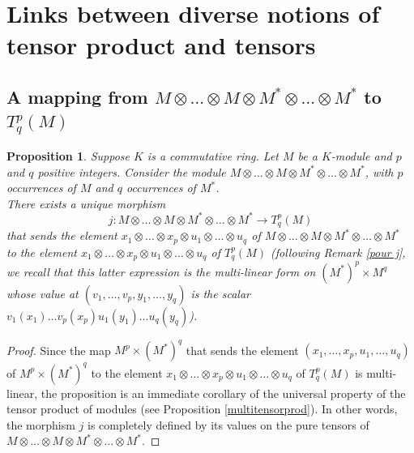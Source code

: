 \documentclass{report}
\newtheorem{prop}{Proposition}
\theoremstyle{definition}
\theoremstyle{remark}
\begin{document}
\bigskip



 
\section{Links between diverse notions of tensor product and tensors} 

\subsection{A mapping from $M\otimes \dots \otimes M\otimes M^* \otimes \dots \otimes M^*   $ to  $T^p_q(M)$}





\begin{prop} \label{lien tenseurs}
    Suppose $K$ is a commutative ring. Let $M$ be a $K$-module and $p$ and $q$ positive integers. Consider the module $M\otimes \dots \otimes M\otimes M^* \otimes \dots \otimes M^* $, with $p$ occurrences of $M$ and $q$ occurrences of $M^*$.\\
    There exists a unique morphism 
    $$j: M\otimes \dots \otimes M\otimes M^* \otimes \dots \otimes M^*  \to T^p_q(M)$$
    that sends the element $x_1 \otimes\dots \otimes x_p \otimes u_1 \otimes \dots \otimes u_q $ of $ M\otimes \dots \otimes M\otimes M^* \otimes \dots \otimes M^* $\\
    to the element  $x_1 \otimes\dots \otimes x_p \otimes u_1 \otimes \dots \otimes u_q $ of $T^p_q(M)$ 
    (following Remark \ref{pour j}, we recall that this latter expression is the multi-linear form on $(M^*)^p \times M^q$ whose value at $(v_1,  \dots , v_p,y_1,\dots,y_q) $ is the scalar $v_1(x_1) \dots v_p(x_p)u_1(y_1)\dots u_q(y_q)$).
   
   
   
\end{prop}
    
\begin{proof}
Since the map $M^p \times (M^*)^q$ that sends the element $(x_1,  \dots , x_p,u_1,\dots,u_q) $ of $M^p \times (M^*)^q$ to the element $x_1 \otimes\dots \otimes x_p \otimes u_1 \otimes \dots \otimes u_q $ of $T^p_q(M)$ is multi-linear, the proposition is an immediate corollary of the universal property of the tensor product of modules (see Proposition \ref{multitensorprod}). In other words, the morphism $j$ is completely defined by its values on the pure tensors of $M\otimes \dots \otimes M\otimes M^* \otimes \dots \otimes M^*$.

\end{proof}
    
\end{document}
